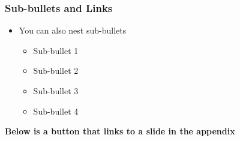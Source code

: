 \begin{frame}
    \label{Test} %
    \frametitle{Sub-bullets and Links}

    \begin{itemize}
        \item You can also nest sub-bullets
              \begin{itemize}
                  \item Sub-bullet 1
                  \item Sub-bullet 2
                  \item Sub-bullet 3
                  \item Sub-bullet 4 \newline
              \end{itemize}
    \end{itemize}

    \textbf{Below is a button that links to a slide in the appendix}

    \begin{center}
        \hyperlink{Figure}{}
    \end{center}
\end{frame}
